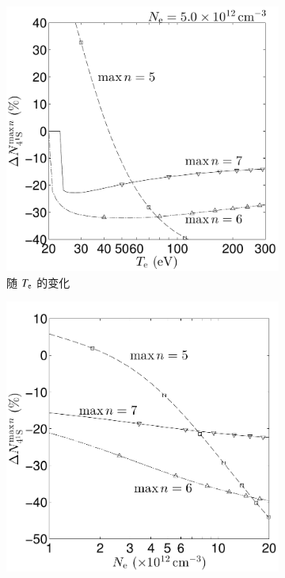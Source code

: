 \begin{figure}%
    \centering
    \begin{subfigure}{0.47\textwidth}
        \includegraphics[width=\textwidth]{levelabun-13-41S-Ne5_0E12-ss-reldiff-manx4to7.pdf}
        \caption{随 $T_{\rm e}$ 的变化}%
        \label{fig:chap03:41S-levelabun-reldiff:1}
    \end{subfigure}
    \begin{subfigure}{0.47\columnwidth}
        \includegraphics[width=\columnwidth]{levelabun-13-41S-Te50-ss-reldiff-manx4to7.pdf}

\end{subfigure}
\end{figure}
